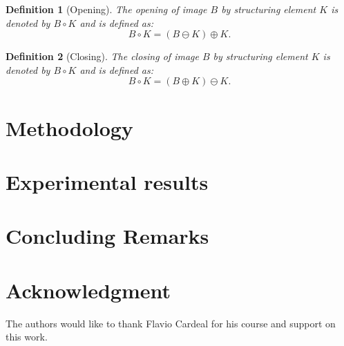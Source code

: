 \documentclass[10pt, conference]{IEEEtran}
\newtheorem{definition}{Definition}
\begin{document}
\begin{definition}[Opening]
The opening of image $B$ by structuring	element $K$ is denoted by $B \circ K$ and is defined as: $$B \circ K =(B \ominus K) \oplus K.$$
\end{definition}

\begin{definition}[Closing]
The closing of image $B$ by structuring	element $K$ is denoted by $B \circ K$ and is defined as: $$B \circ K =(B \oplus K) \ominus K.$$
\end{definition}

\section{Methodology}

\section{Experimental results}

\section{Concluding Remarks}

\section*{Acknowledgment}
The authors would like to thank Flavio Cardeal for his course and support on this work.




\end{document}

